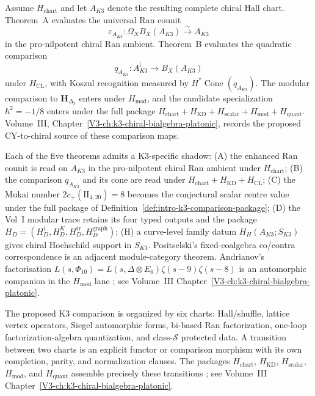 \begin{remark}
\label{rem:v1-intro-1}
Assume $H_{\mathrm{chart}}$ and let $A_{K3}$ denote the resulting
complete chiral Hall chart.  Theorem~A evaluates the universal Ran
counit
\[
\varepsilon_{A_{K3}}\colon
\Omega_XB_X(A_{K3})\xrightarrow{\sim}A_{K3}
\]
in the pro-nilpotent chiral Ran ambient.  Theorem~B evaluates the quadratic
comparison
\[
q_{A_{K3}}\colon A_{K3}^{\mathrm i}\longrightarrow B_X(A_{K3})
\]
under $H_{\mathrm{CL}}$, with Koszul recognition measured by
$H^*\operatorname{Cone}(q_{A_{K3}})$.  The modular comparison to
$\mathbf H_{\Delta_5}$ enters under $H_{\mathrm{mod}}$, and the
candidate specialization $\hbar^2=-1/8$ enters under the full package
$H_{\mathrm{chart}}+H_{\mathrm{KD}}+H_{\mathrm{scalar}}
+H_{\mathrm{mod}}+H_{\mathrm{quant}}$.  Volume~III,
Chapter~\ref{V3-ch:k3-chiral-bialgebra-platonic}, records the proposed
CY-to-chiral source of these comparison maps.
\end{remark}

\begin{remark}
\label{rem:v1-intro-2}
Each of the five theorems admits a K3-specific shadow: (A) the
enhanced Ran counit is read on $A_{K3}$ in the pro-nilpotent chiral
Ran ambient under $H_{\mathrm{chart}}$; (B) the comparison
$q_{A_{K3}}$ and its cone are read under
$H_{\mathrm{chart}}+H_{\mathrm{KD}}+H_{\mathrm{CL}}$; (C) the
Mukai number $2c_+(\mathrm{II}_{4,20})=8$ becomes the conjectural
scalar centre value under the full package of
Definition~\ref{def:intro-k3-comparison-package}; (D) the Vol~I
modular trace retains its four typed outputs and the package
$H_D=(H_D^1,H_D^K,H_D^{\mathrm{tr}},H_D^{\mathrm{graph}})$; (H) a curve-level family
datum $H_H(A_{K3};S_{K3})$ gives chiral Hochschild support in
$S_{K3}$. Positselski's fixed-coalgebra co/contra correspondence is an
adjacent module-category theorem. Andrianov's
factorisation
$L(s,\Phi_{10}) = L(s,\Delta\otimes E_6)\zeta(s-9)\zeta(s-8)$
is an automorphic companion in the $H_{\mathrm{mod}}$ lane
\cite{Andrianov1979,ChengDuncanHarvey2014,Mukai1987}; see Volume~III
Chapter~\ref{V3-ch:k3-chiral-bialgebra-platonic}.
\end{remark}

\begin{remark}
\label{rem:v1-intro-3}
The proposed K3 comparison is organized by six charts:
Hall/shuffle, lattice vertex operators, Siegel automorphic forms,
bi-based Ran factorization, one-loop factorization-algebra
quantization, and class-$\mathcal S$ protected data.  A transition
between two charts is an explicit functor or comparison morphism with
its own completion, parity, and normalization clauses.  The packages
$H_{\mathrm{chart}}$, $H_{\mathrm{KD}}$, $H_{\mathrm{scalar}}$,
$H_{\mathrm{mod}}$, and $H_{\mathrm{quant}}$ assemble precisely these transitions
\cite{SchiffmannVasserot2012,PasolZagier2013,Gaiotto2009}; see
Volume~III Chapter~\ref{V3-ch:k3-chiral-bialgebra-platonic}.
\end{remark}

